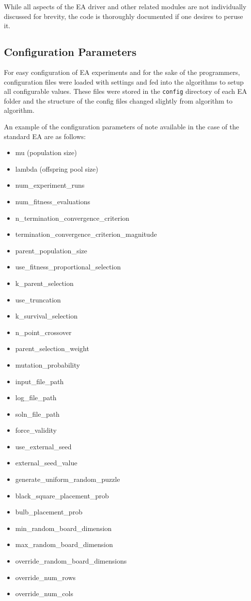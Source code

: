 \documentclass[11pt]{article}
\begin{document}
While all aspects of the EA driver and other related modules
are not individually discussed for brevity, the code is 
thoroughly documented if one desires to peruse it.


\subsection{Configuration Parameters}

For easy configuration of EA experiments and for the sake of 
the programmers, configuration files were loaded with settings
and fed into the algorithms to setup all configurable values.
These files were stored in the \texttt{config} directory
of each EA folder and the structure of the config files 
changed slightly from algorithm to algorithm.

An example of the configuration parameters of note available in the 
case of the standard EA are as follows:

\begin{itemize}
    \item mu (population size)
    \item lambda (offspring pool size)
    \item num\_experiment\_runs 
    \item num\_fitness\_evaluations 
    \item n\_termination\_convergence\_criterion 
    \item termination\_convergence\_criterion\_magnitude 
    \item parent\_population\_size 
    \item use\_fitness\_proportional\_selection 
    \item k\_parent\_selection 
    \item use\_truncation 
    \item k\_survival\_selection 
    \item n\_point\_crossover 
    \item parent\_selection\_weight 
    \item mutation\_probability 
    \item input\_file\_path 
    \item log\_file\_path 
    \item soln\_file\_path 
    \item force\_validity 
    \item use\_external\_seed 
    \item external\_seed\_value
    \item generate\_uniform\_random\_puzzle 
    \item black\_square\_placement\_prob 
    \item bulb\_placement\_prob 
    \item min\_random\_board\_dimension 
    \item max\_random\_board\_dimension 
    \item override\_random\_board\_dimensions 
    \item override\_num\_rows 
    \item override\_num\_cols 
\end{itemize}
\end{document}
